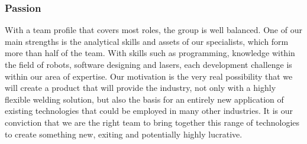 


\subsubsection{Passion}
With a team profile that covers most roles, the group is well balanced. One of our main strengths is the analytical skills and assets of our specialists, which form more than half of the team.  
With skills such as programming, knowledge within the field of robots, software designing and lasers, each development challenge is within our area of expertise. 
Our motivation is the very real possibility that we will create a product that will provide the industry, not only with a highly flexible welding solution, but also the basis for an entirely new application of existing technologies that could be employed in many other industries.
It is our conviction that we are the right team to bring together this range of technologies to create something new, exiting and potentially highly lucrative.